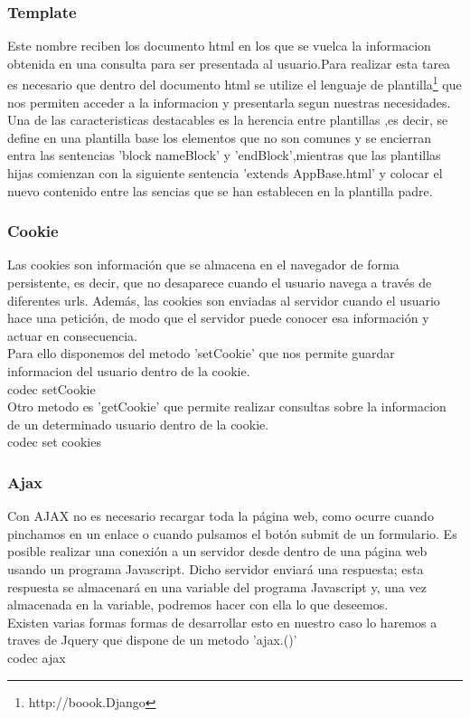 \subsubsection{Template}
Este nombre reciben los documento html en los que se vuelca la informacion obtenida en una consulta para ser presentada al usuario.Para realizar esta tarea es necesario que dentro del  documento html se utilize el lenguaje de plantilla\footnote{http://boook.Django} que nos permiten acceder a la informacion y presentarla segun nuestras necesidades.
\\Una de las caracteristicas destacables es la herencia entre plantillas ,es decir, se define en una plantilla base los elementos que no son comunes y se encierran entra las sentencias 'block nameBlock'  y 'endBlock',mientras que las plantillas hijas comienzan con la siguiente sentencia 'extends AppBase.html' y colocar el nuevo contenido entre las sencias que se han establecen en la plantilla padre.

\subsubsection{Cookie}
Las cookies son información que se almacena en el navegador de forma persistente, es decir, que no desaparece cuando el usuario navega a través de diferentes urls. Además, las cookies son enviadas al servidor cuando el usuario hace una petición, de modo que el servidor puede conocer esa información y actuar en consecuencia.
\\Para ello disponemos del metodo  'setCookie' que nos permite guardar informacion del usuario dentro de la cookie. 
\\codec setCookie
\\Otro metodo es 'getCookie' que permite realizar consultas sobre la informacion de un determinado usuario dentro de la cookie.
\\codec set cookies

\subsubsection{Ajax}
Con AJAX no es necesario recargar toda la página web, como ocurre cuando pinchamos en un enlace o cuando pulsamos el botón submit de un formulario. Es posible realizar una conexión a un servidor desde dentro de una página web usando un programa Javascript. Dicho servidor enviará una respuesta; esta respuesta se almacenará en una variable del programa Javascript y, una vez almacenada en la variable, podremos hacer con ella lo que deseemos.
\\Existen varias formas formas de desarrollar esto en nuestro caso lo haremos a traves de Jquery que dispone de un metodo 'ajax.()' 
\\codec ajax
